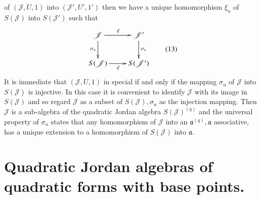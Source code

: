 of $(\mathscr{J},U,1)$ into $(\mathscr{J}',U',1')$ then we have a
unique homomorphism $\xi_u$ of $S(\mathscr{J})$ into $S(\mathscr{J}')$
such that
\begin{equation*}
\vcenter{\xymatrix{
\mathscr{J}\ar[d]_{\sigma_u}\ar[r]^{\xi}& \mathscr{J}'\ar[d]^{\sigma_u}\\
S(\mathscr{J})\ar[r]_{\xi}& S(\mathscr{J}')
}}\tag{13}
\end{equation*}\pageoriginale
It is immediate that $(\mathscr{J},U,1)$ in special if and only if the
mapping $\sigma_{u}$ of $\mathscr{J}$ into $S(\mathscr{J})$ is
injective. In this case it is convenient to identify $\mathscr{J}$
with its image in $S(\mathscr{J})$ and so regard $\mathscr{J}$ as a
subset of $S(\mathscr{J}),\sigma_u$ as the injection mapping. Then
$\mathscr{J}$ is a sub-algebra of the quadratic Jordan algebra
$S(\mathscr{J})^{(q)}$ and the universal property of $\sigma_{u}$
states that any homomorphism of $\mathscr{J}$ into an
$\mathfrak{a}^{(q)},\mathfrak{a}$ associative, has a unique extension
to a homomorphism of $S(\mathscr{J})$ into $\mathfrak{a}$.

\section[Quadratic Jordan algebras of quadratic forms...]{Quadratic
  Jordan algebras of quadratic forms\hfil\break 
with base points.}\label{c1:sec7} 

